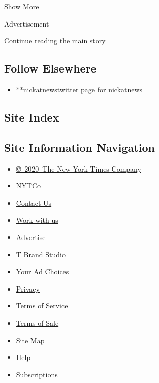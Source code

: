 Show More

Advertisement

\protect\hyperlink{after-mid2}{Continue reading the main story}

\hypertarget{follow-elsewhere}{%
\subsection{Follow Elsewhere}\label{follow-elsewhere}}

\begin{itemize}
\tightlist
\item
  \href{https://twitter.com/nickatnews}{**nickatnewstwitter page for
  nickatnews}
\end{itemize}

\hypertarget{site-index}{%
\subsection{Site Index}\label{site-index}}

\hypertarget{site-information-navigation}{%
\subsection{Site Information
Navigation}\label{site-information-navigation}}

\begin{itemize}
\tightlist
\item
  \href{https://help.nytimes3xbfgragh.onion/hc/en-us/articles/115014792127-Copyright-notice}{©~2020~The
  New York Times Company}
\end{itemize}

\begin{itemize}
\tightlist
\item
  \href{https://www.nytco.com/}{NYTCo}
\item
  \href{https://help.nytimes3xbfgragh.onion/hc/en-us/articles/115015385887-Contact-Us}{Contact
  Us}
\item
  \href{https://www.nytco.com/careers/}{Work with us}
\item
  \href{https://nytmediakit.com/}{Advertise}
\item
  \href{http://www.tbrandstudio.com/}{T Brand Studio}
\item
  \href{https://www.nytimes3xbfgragh.onion/privacy/cookie-policy\#how-do-i-manage-trackers}{Your
  Ad Choices}
\item
  \href{https://www.nytimes3xbfgragh.onion/privacy}{Privacy}
\item
  \href{https://help.nytimes3xbfgragh.onion/hc/en-us/articles/115014893428-Terms-of-service}{Terms
  of Service}
\item
  \href{https://help.nytimes3xbfgragh.onion/hc/en-us/articles/115014893968-Terms-of-sale}{Terms
  of Sale}
\item
  \href{https://spiderbites.nytimes3xbfgragh.onion}{Site Map}
\item
  \href{https://help.nytimes3xbfgragh.onion/hc/en-us}{Help}
\item
  \href{https://www.nytimes3xbfgragh.onion/subscription?campaignId=37WXW}{Subscriptions}
\end{itemize}

